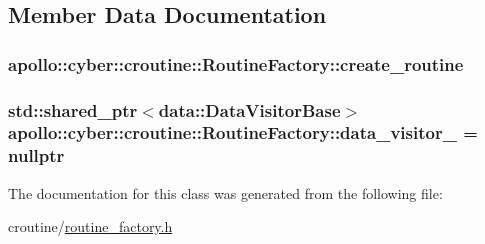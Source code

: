 \subsection{Member Data Documentation}
\hypertarget{classapollo_1_1cyber_1_1croutine_1_1RoutineFactory_a24a0cf1b6bd5edc79ebced27447a976a}{
\subsubsection[{create\-\_\-routine}]{ apollo\-::cyber\-::croutine\-::\-Routine\-Factory\-::create\-\_\-routine}}\label{classapollo_1_1cyber_1_1croutine_1_1RoutineFactory_a24a0cf1b6bd5edc79ebced27447a976a}
\hypertarget{classapollo_1_1cyber_1_1croutine_1_1RoutineFactory_a6cb823ff0baa71ccfb349c6087b0a60a}{
\subsubsection[{data\-\_\-visitor\-\_\-}]{\setlength{\rightskip}{0pt plus 5cm}std\-::shared\-\_\-ptr$<${\bf data\-::\-Data\-Visitor\-Base}$>$ apollo\-::cyber\-::croutine\-::\-Routine\-Factory\-::data\-\_\-visitor\-\_\- = nullptr\hspace{0.3cm}{\ttfamily [private]}}}\label{classapollo_1_1cyber_1_1croutine_1_1RoutineFactory_a6cb823ff0baa71ccfb349c6087b0a60a}


The documentation for this class was generated from the following file\-:\begin{DoxyCompactItemize}
\item 
croutine/\hyperlink{routine__factory_8h}{routine\-\_\-factory.\-h}\end{DoxyCompactItemize}
